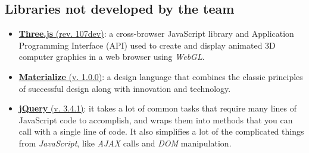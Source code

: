 \documentclass{article}
\begin{document}
\subsection{Libraries not developed by the team}
\begin{itemize}
	\item \href{https://threejs.org/}{\textbf{Three.js} (rev. 107dev)}: a cross-browser JavaScript library and Application Programming Interface (API) used to create and display animated 3D computer graphics in a web browser using \textit{WebGL}.
	\item \href{https://materializecss.com/}{\textbf{Materialize} (v. 1.0.0)}: a design language that combines the classic principles of successful design along with innovation and technology.
	\item \href{https://jquery.com/}{\textbf{jQuery} (v. 3.4.1)}: it takes a lot of common tasks that require many lines of JavaScript code to accomplish, and wraps them into methods that you can call with a single line of code. It also simplifies a lot of the complicated things from \textit{JavaScript}, like \textit{AJAX} calls and \textit{DOM} manipulation.
\end{itemize}
\end{document}
